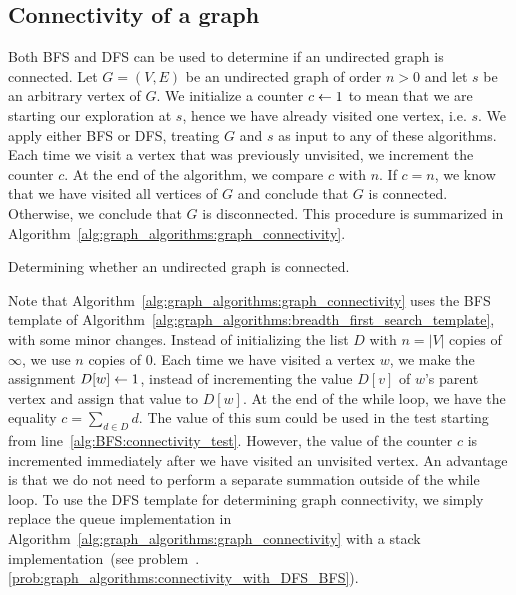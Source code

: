 
\subsection{Connectivity of a graph}

Both BFS and DFS can be used to determine if an
undirected graph is connected. Let $G = (V, E)$ be an undirected graph
of order $n > 0$ and let $s$ be an arbitrary vertex of $G$. We
initialize a counter $c \leftarrow 1$ to mean that we are starting our
exploration at $s$, hence we have already visited one vertex,
i.e. $s$. We apply either BFS or DFS, treating
$G$ and $s$ as input to any of these algorithms. Each time we visit a
vertex that was previously unvisited, we increment the counter $c$. At
the end of the algorithm, we compare $c$ with $n$. If $c = n$, we know
that we have visited all vertices of $G$ and conclude that $G$ is
connected. Otherwise, we conclude that $G$ is disconnected. This
procedure is summarized in
Algorithm~\ref{alg:graph_algorithms:graph_connectivity}.

\begin{algorithm}[!htbp]

\caption{Determining whether an undirected graph is connected.}
\label{alg:graph_algorithms:graph_connectivity}
\end{algorithm}

Note that Algorithm~\ref{alg:graph_algorithms:graph_connectivity} uses
the BFS template of
Algorithm~\ref{alg:graph_algorithms:breadth_first_search_template},
with some minor changes. Instead of initializing the list $D$ with
$n = |V|$ copies of $\infty$, we use $n$ copies of $0$. Each time we
have visited a vertex $w$, we make the assignment $D[w] \leftarrow 1$,
instead of incrementing the value $D[v]$ of $w$'s parent vertex and
assign that value to $D[w]$. At the end of the while loop, we have the
equality $c = \sum_{d \in D} d$. The value of this sum could be used
in the test starting from line~\ref{alg:BFS:connectivity_test}.
However, the value of the counter $c$ is incremented immediately after
we have visited an unvisited vertex. An advantage is that we do not
need to perform a separate summation outside of the while loop. To use
the DFS template for determining graph
connectivity, we simply replace the
queue implementation in
Algorithm~\ref{alg:graph_algorithms:graph_connectivity} with a
stack implementation~(see
problem~\thechapter.\ref{prob:graph_algorithms:connectivity_with_DFS_BFS}).


